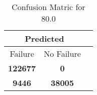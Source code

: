 \begin{table}[] 
\caption{Confusion Matric for 80.0} 
\label{Table: Prediction Accuracy-DMD80.0OnlySunEKF-resetReflectionperfectNoFailurePrediction-Reflection} 
\centering 
\begin{tabular} 
 {@{}ccc@{}} 
\toprule 
\multicolumn{2}{c}{\textbf{Predicted}}
 \\ \midrule 
\multicolumn{1}{|c|}{Failure} & 
\multicolumn{1}{c|}{No Failure}
 \\ \midrule 
\multicolumn{1}{|c|}{\color{green}\textbf{122677}} & 
\multicolumn{1}{c|}{\color{red}\textbf{0}}
 \\ \midrule 
\multicolumn{1}{|c|}{\color{red}\textbf{9446}} & 
\multicolumn{1}{c|}{\color{green}\textbf{38005}}
 \\ \bottomrule 
\end{tabular} 
\end{table} 
